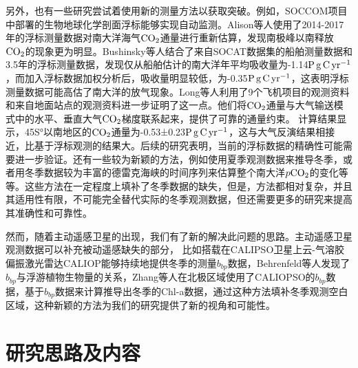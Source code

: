 另外，也有一些研究尝试着使用新的测量方法以获取突破。例如，SOCCOM项目中部署的生物地球化学剖面浮标能够实现自动监测。Alison等人\cite{gray2018autonomous}使用了2014-2017年的浮标测量数据对南大洋海气$\rm CO_2$通量进行重新估算，发现南极峰以南释放$\rm CO_2$的现象更为明显。Bushinsky等人\cite{bushinsky2019reassessing}结合了来自SOCAT数据集的船舶测量数据和3.5年的浮标测量数据，发现仅从船舶估计的南大洋年平均吸收量为-1.14$\rm P \, g \, C \, yr^{-1}$，而加入浮标数据加权分析后，吸收量明显较低，为-0.35$\rm P \, g \, C \, yr^{-1}$，这表明浮标测量数据可能高估了南大洋的放气现象。Long等人\cite{long2021strong}利用了9个飞机项目的观测资料和来自地面站点的观测资料进一步证明了这一点。他们将$\rm CO_2$通量与大气输送模式中的水平、垂直大气$\rm CO_2$梯度联系起来，提供了可靠的通量约束。 计算结果显示，45S°以南地区的$\rm CO_2$通量为-0.53±0.23$\rm P\, g\, C\, yr^{-1}$，这与大气反演结果相接近，比基于浮标观测的结果大。后续的研究\cite{wu2023controversial}表明，当前的浮标数据的精确性可能需要进一步验证。还有一些较为新颖的方法，例如使用夏季观测数据来推导冬季\cite{mackay2022improved}，或者用冬季数据较为丰富的德雷克海峡的时间序列来估算整个南大洋$p\rm CO_2$的变化\cite{fay2018utilizing}等等。这些方法在一定程度上填补了冬季数据的缺失，但是，方法都相对复杂，并且其适用性有限，不可能完全替代实际的冬季观测数据，但还需要更多的研究来提高其准确性和可靠性。

然而，随着主动遥感卫星的出现，我们有了新的解决此问题的思路。主动遥感卫星观测数据可以补充被动遥感缺失的部分，
比如搭载在CALIPSO卫星上云-气溶胶偏振激光雷达CALIOP能够持续地提供冬季的测量$b_{bp}$数据，Behrenfeld等人\cite{bbp_Annual_2017}发现了$b_{bp}$与浮游植物生物量的关系，Zhang等人\cite{zhang2022carbon}在北极区域使用了CALIOPSO的$b_{bp}$数据，基于$b_{bp}$数据来计算推导出冬季的Chl-a数据，通过这种方法填补冬季观测空白区域，这种新颖的方法为我们的研究提供了新的视角和可能性。
\section{研究思路及内容}
